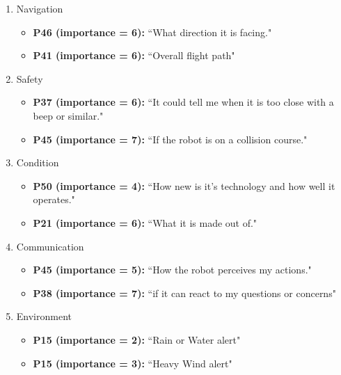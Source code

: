 \documentclass[letterpaper, 10 pt, conference]{ieeeconf}  %
\begin{document}
\begin{enumerate}

\item Navigation
    \begin{itemize}
        \item  \textbf{P46 (importance = 6):} ``What direction it is facing."
        \item  \textbf{P41 (importance = 6):} ``Overall flight path"
    \end{itemize}

\item Safety
    \begin{itemize}
    \item  \textbf{P37 (importance = 6):} ``It could tell me when it is too close with a beep or similar."
    \item  \textbf{P45 (importance = 7):} ``If the robot is on a collision course."
    \end{itemize}
    
\item Condition
    \begin{itemize}
        \item  \textbf{P50 (importance = 4):} ``How new is it's technology and how well it operates."
        \item  \textbf{P21 (importance = 6):} ``What it is made out of."
    \end{itemize}


\item Communication
    \begin{itemize}
    \item  \textbf{P45 (importance = 5):} ``How the robot perceives my actions."
    \item  \textbf{P38 (importance = 7):} ``if it can react to my questions or concerns"
    \end{itemize}

\item Environment
    \begin{itemize}
    \item  \textbf{P15 (importance = 2):} ``Rain or Water alert"
    \item  \textbf{P15 (importance = 3):} ``Heavy Wind alert"
    \end{itemize}
    

\end{enumerate}
\end{document}
